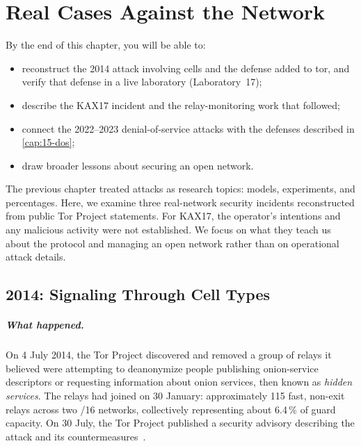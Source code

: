 \chapter{Real Cases Against the Network}\label{cap:27-casi-rete}

\begin{obiettivi}
By the end of this chapter, you will be able to:
\begin{itemize}[nosep]
  \item reconstruct the 2014 attack involving  cells and the defense added to tor, and verify that defense in a live laboratory (Laboratory~17);
  \item describe the KAX17 incident and the relay-monitoring work that followed;
  \item connect the 2022--2023 denial-of-service attacks with the defenses described in \cref{cap:15-dos};
  \item draw broader lessons about securing an open network.
\end{itemize}
\end{obiettivi}

The previous chapter treated attacks as research topics: models, experiments, and percentages. Here, we examine three real-network security incidents reconstructed from public Tor Project statements. For KAX17, the operator's intentions and any malicious activity were not established. We focus on what they teach us about the protocol and managing an open network rather than on operational attack details.

\section{2014: Signaling Through Cell Types}\label{sec:casi-relayearly}

\paragraph{What happened.} On 4 July 2014, the Tor Project discovered and removed a group of relays it believed were attempting to deanonymize people publishing onion-service descriptors or requesting information about onion services, then known as \emph{hidden services}. The relays had joined on 30 January: approximately 115 fast, non-exit relays across two /16 networks, collectively representing about 6.4\,\% of guard capacity. On 30 July, the Tor Project published a security advisory describing the attack and its countermeasures~\cite{torblog2014relayearly}.

